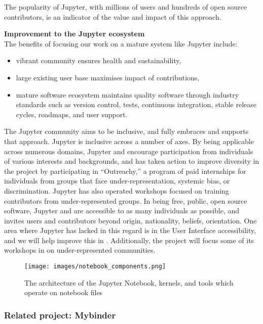 The popularity of Jupyter, with millions of users and hundreds of open
source contributors, is an indicator of the value and impact of this approach.

\medskip
\noindent\textbf{Improvement to the Jupyter ecosystem}\\
The benefits of focusing our work on a mature system like Jupyter include:

\begin{itemize}
\item vibrant community ensures health and sustainability,
\item large existing user base maximises impact of contributions,
\item mature software ecosystem maintains quality software through
  industry standards such as version control, tests, continuous
  integration, stable release cycles, roadmaps, and user support.
\end{itemize}

The Jupyter community aims to be inclusive, and \TheProject fully
embraces and supports that approach.  Jupyter is inclusive across a number of axes.
By being applicable across numerous domains, Jupyter and \TheProject
encourage participation from individuals of various interests and
backgrounds, and has taken action to improve diversity in the project
by participating in ``Outreachy,'' a program of paid internships for
individuals from groups that face under-representation, systemic bias,
or discrimination.  Jupyter has also operated workshops focused on
training contributors from under-represented groups.  In being free,
public, open source software, Jupyter and \TheProject are accessible
to as many individuals as possible, and invites users and contributors
beyond origin, nationality, beliefs, orientation.  One area where
Jupyter has lacked in this regard is in the User Interface
accessibility, and we will help improve this in
.  Additionally, the project will
focus some of its workshops in
on
under-represented communities.


\begin{figure}[ht!]\centering
  \texttt{[image: images/notebook\_components.png]}
  \caption{The architecture of the Jupyter Notebook, kernels, and tools
        which operate on notebook files}
  \label{fig:notebook-architecture}
\end{figure}

\subsubsection{Related project: Mybinder}\label{sec:mybinder}

